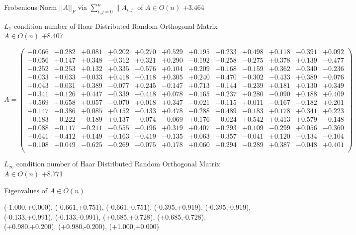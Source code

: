 \documentclass[9pt]{article}
\theoremstyle{plain}
\theoremstyle{definition}
\theoremstyle{remark}
\numberwithin{equation}{section}
\begin{document}
Frobenious Norm  $||A||_{\textit{F}}$ via $\sum\limits_{i,j =0}^{n} \|A_{i,j}|$   of  $A \in O(n)$  +3.464

$L_1$ condition number of Haar Distributed Random Orthogonal Matrix $A \in O(n)$ +8.407

$A = \left(
\begin{array}{
cccccccccccc}
-0.066 & -0.282 & +0.081 & +0.202 & +0.270 & +0.529 & +0.195 & +0.233 & +0.498 & +0.118 & -0.391 & +0.092 \\
-0.056 & +0.147 & +0.348 & -0.312 & +0.321 & +0.290 & -0.192 & +0.258 & -0.275 & +0.378 & +0.139 & -0.477 \\
-0.252 & +0.253 & +0.132 & +0.335 & -0.576 & +0.104 & +0.209 & -0.168 & -0.159 & +0.362 & -0.340 & -0.236 \\
-0.033 & +0.033 & -0.033 & +0.418 & -0.118 & +0.305 & +0.240 & +0.470 & -0.302 & -0.433 & +0.389 & -0.076 \\
+0.043 & -0.031 & +0.389 & -0.077 & +0.245 & -0.147 & +0.713 & -0.144 & -0.239 & +0.181 & +0.130 & +0.349 \\
-0.341 & +0.126 & +0.447 & -0.339 & -0.418 & +0.078 & -0.165 & +0.237 & +0.280 & -0.090 & +0.188 & +0.409 \\
+0.569 & +0.658 & +0.057 & -0.070 & +0.018 & +0.347 & -0.021 & -0.115 & +0.011 & -0.167 & -0.182 & +0.201 \\
+0.147 & -0.386 & +0.085 & +0.152 & -0.133 & +0.478 & -0.288 & -0.489 & -0.183 & +0.178 & +0.341 & +0.223 \\
+0.183 & +0.222 & -0.189 & +0.137 & -0.074 & -0.069 & +0.176 & +0.024 & +0.542 & +0.413 & +0.579 & -0.148 \\
-0.088 & -0.117 & -0.211 & -0.555 & -0.196 & +0.319 & +0.407 & -0.293 & +0.109 & -0.299 & +0.056 & -0.360 \\
+0.641 & -0.412 & +0.149 & -0.163 & -0.419 & -0.135 & +0.063 & +0.357 & -0.041 & +0.120 & -0.134 & -0.104 \\
-0.108 & +0.049 & -0.625 & -0.269 & -0.075 & +0.178 & +0.060 & +0.294 & -0.289 & +0.387 & -0.048 & +0.401 \\
\end{array}
\right)$ \newline 

$L_{\infty}$ condition number of Haar Distributed Random Orthogonal Matrix $A \in O(n)$ +8.771

Eigenvalues of $A \in O(n)$

(-1.000,+0.000), (-0.661,+0.751), (-0.661,-0.751), (-0.395,+0.919), (-0.395,-0.919), (-0.133,+0.991), (-0.133,-0.991), (+0.685,+0.728), (+0.685,-0.728), (+0.980,+0.200), (+0.980,-0.200), (+1.000,+0.000)
\end{document}
